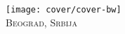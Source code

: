 \newpage
\thispagestyle{empty}
\begin{center}
\texttt{[image: cover/cover-bw]}\\[1pc]
{\scshape Beograd, Srbija \\ \year}
\end{center}
